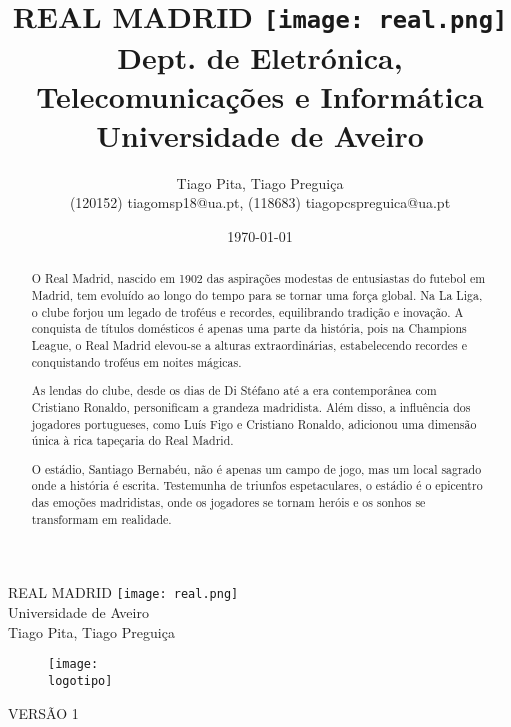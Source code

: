 \documentclass{report}
\begin{document}
%
\def\titulo{REAL MADRID \protect\texttt{[image: real.png]}}
\def\data{DATA}
\def\autores{Tiago Pita, Tiago Preguiça}
\def\autorescontactos{(120152) tiagomsp18@ua.pt, (118683) tiagopcspreguica@ua.pt}
\def\versao{VERSÃO 1}
\def\departamento{Dept. de Eletrónica, Telecomunicações e Informática}
\def\empresa{Universidade de Aveiro}
\def\logotipo{ua.pdf}
%
%
\begin{titlepage}

\begin{center}
%
\vspace*{50mm}
%
{\Huge \titulo}\\ 
%
\vspace{10mm}
%
{\Large \empresa}\\
%
\vspace{10mm}
%
{\LARGE \autores}\\ 
%
\vspace{20mm}
%
\begin{figure}[h]
    \center
    \texttt{[image: \\logotipo]}
\end{figure}
%
\vspace{20mm}
\end{center}
%
\begin{flushright}
\versao
\end{flushright}
\end{titlepage}

\title{%
{\Huge\textbf{\titulo}}\\
{\Large \departamento\\ \empresa}
}
%
\author{%
    \autores \\
    \autorescontactos
}
%
\date{\today}
%
\maketitle


\begin{abstract}

O Real Madrid, nascido em 1902 das aspirações modestas de entusiastas do futebol em Madrid, tem evoluído ao longo do tempo para se tornar uma força global. Na La Liga, o clube forjou um legado de troféus e recordes, equilibrando tradição e inovação. A conquista de títulos domésticos é apenas uma parte da história, pois na Champions League, o Real Madrid elevou-se a alturas extraordinárias, estabelecendo recordes e conquistando troféus em noites mágicas.

As lendas do clube, desde os dias de Di Stéfano até a era contemporânea com Cristiano Ronaldo, personificam a grandeza madridista. Além disso, a influência dos jogadores portugueses, como Luís Figo e Cristiano Ronaldo, adicionou uma dimensão única à rica tapeçaria do Real Madrid.

O estádio, Santiago Bernabéu, não é apenas um campo de jogo, mas um local sagrado onde a história é escrita. Testemunha de triunfos espetaculares, o estádio é o epicentro das emoções madridistas, onde os jogadores se tornam heróis e os sonhos se transformam em realidade.
\end{abstract}
\end{document}
